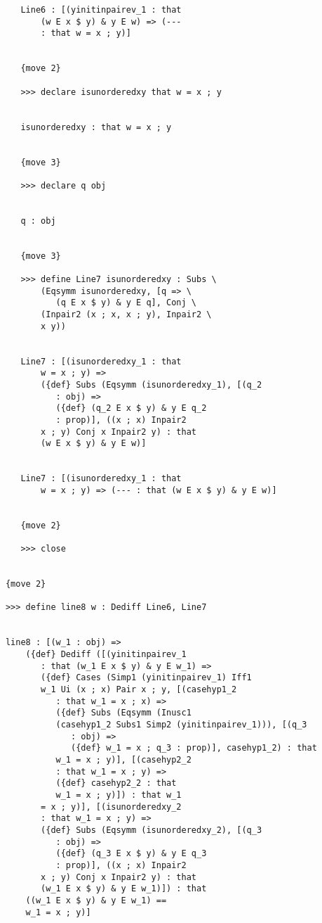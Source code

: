 \documentclass[12pt]{article}
\begin{document}
\begin{verbatim}
         Line6 : [(yinitinpairev_1 : that 
             (w E x $ y) & y E w) => (--- 
             : that w = x ; y)]


         {move 2}

         >>> declare isunorderedxy that w = x ; y


         isunorderedxy : that w = x ; y


         {move 3}

         >>> declare q obj


         q : obj


         {move 3}

         >>> define Line7 isunorderedxy : Subs \
             (Eqsymm isunorderedxy, [q => \
                (q E x $ y) & y E q], Conj \
             (Inpair2 (x ; x, x ; y), Inpair2 \
             x y))


         Line7 : [(isunorderedxy_1 : that 
             w = x ; y) => 
             ({def} Subs (Eqsymm (isunorderedxy_1), [(q_2 
                : obj) => 
                ({def} (q_2 E x $ y) & y E q_2 
                : prop)], ((x ; x) Inpair2 
             x ; y) Conj x Inpair2 y) : that 
             (w E x $ y) & y E w)]


         Line7 : [(isunorderedxy_1 : that 
             w = x ; y) => (--- : that (w E x $ y) & y E w)]


         {move 2}

         >>> close


      {move 2}

      >>> define line8 w : Dediff Line6, Line7


      line8 : [(w_1 : obj) => 
          ({def} Dediff ([(yinitinpairev_1 
             : that (w_1 E x $ y) & y E w_1) => 
             ({def} Cases (Simp1 (yinitinpairev_1) Iff1 
             w_1 Ui (x ; x) Pair x ; y, [(casehyp1_2 
                : that w_1 = x ; x) => 
                ({def} Subs (Eqsymm (Inusc1 
                (casehyp1_2 Subs1 Simp2 (yinitinpairev_1))), [(q_3 
                   : obj) => 
                   ({def} w_1 = x ; q_3 : prop)], casehyp1_2) : that 
                w_1 = x ; y)], [(casehyp2_2 
                : that w_1 = x ; y) => 
                ({def} casehyp2_2 : that 
                w_1 = x ; y)]) : that w_1 
             = x ; y)], [(isunorderedxy_2 
             : that w_1 = x ; y) => 
             ({def} Subs (Eqsymm (isunorderedxy_2), [(q_3 
                : obj) => 
                ({def} (q_3 E x $ y) & y E q_3 
                : prop)], ((x ; x) Inpair2 
             x ; y) Conj x Inpair2 y) : that 
             (w_1 E x $ y) & y E w_1)]) : that 
          ((w_1 E x $ y) & y E w_1) == 
          w_1 = x ; y)]



\end{verbatim}
\end{document}
